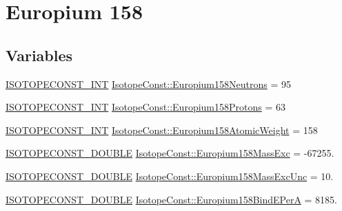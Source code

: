 \hypertarget{group___isotope_const-_europium-_eu158}{}\section{Europium 158}
\label{group___isotope_const-_europium-_eu158}
\subsection*{Variables}
\begin{DoxyCompactItemize}
\item 
\mbox{\hyperlink{group___isotope_const-_macros_ga5f18360b3e99483a35c32d789e62621c}{I\+S\+O\+T\+O\+P\+E\+C\+O\+N\+S\+T\+\_\+\+I\+NT}} \mbox{\hyperlink{group___isotope_const-_europium-_eu158_ga6811c256637b783f157a59e072bb4b2d}{Isotope\+Const\+::\+Europium158\+Neutrons}} = 95
\item 
\mbox{\hyperlink{group___isotope_const-_macros_ga5f18360b3e99483a35c32d789e62621c}{I\+S\+O\+T\+O\+P\+E\+C\+O\+N\+S\+T\+\_\+\+I\+NT}} \mbox{\hyperlink{group___isotope_const-_europium-_eu158_gabb17009bc496ddea9a9d61910b55bc4b}{Isotope\+Const\+::\+Europium158\+Protons}} = 63
\item 
\mbox{\hyperlink{group___isotope_const-_macros_ga5f18360b3e99483a35c32d789e62621c}{I\+S\+O\+T\+O\+P\+E\+C\+O\+N\+S\+T\+\_\+\+I\+NT}} \mbox{\hyperlink{group___isotope_const-_europium-_eu158_ga6042d098f45d29f80b1992b2ae8743ae}{Isotope\+Const\+::\+Europium158\+Atomic\+Weight}} = 158
\item 
\mbox{\hyperlink{group___isotope_const-_macros_ga8f45a7272ce02c0b4c65c44636ed719a}{I\+S\+O\+T\+O\+P\+E\+C\+O\+N\+S\+T\+\_\+\+D\+O\+U\+B\+LE}} \mbox{\hyperlink{group___isotope_const-_europium-_eu158_ga0a4d20e57d2dc6b0591bc57d1a65ed2f}{Isotope\+Const\+::\+Europium158\+Mass\+Exc}} = -\/67255.
\item 
\mbox{\hyperlink{group___isotope_const-_macros_ga8f45a7272ce02c0b4c65c44636ed719a}{I\+S\+O\+T\+O\+P\+E\+C\+O\+N\+S\+T\+\_\+\+D\+O\+U\+B\+LE}} \mbox{\hyperlink{group___isotope_const-_europium-_eu158_ga3dc51ea0cb11f24870e86bb302a0e865}{Isotope\+Const\+::\+Europium158\+Mass\+Exc\+Unc}} = 10.
\item 
\mbox{\hyperlink{group___isotope_const-_macros_ga8f45a7272ce02c0b4c65c44636ed719a}{I\+S\+O\+T\+O\+P\+E\+C\+O\+N\+S\+T\+\_\+\+D\+O\+U\+B\+LE}} \mbox{\hyperlink{group___isotope_const-_europium-_eu158_gac8f0a6e20248c10a49abb7e22f7261f6}{Isotope\+Const\+::\+Europium158\+Bind\+E\+PerA}} = 8185.
\item 

\end{DoxyCompactItemize}
